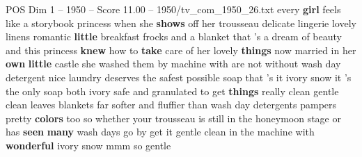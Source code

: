 \begin{textsample}{POS Dim 1 – 1950 – Score 11.00 – 1950/tv\_com\_1950\_26.txt}  \label{ex:f1_pos_003}
every \textbf{girl} feels like a storybook princess when she \textbf{shows} off her trousseau delicate lingerie lovely linens romantic \textbf{little} breakfast frocks and a blanket that 's a dream of beauty and this princess \textbf{knew} how to \textbf{take} care of her lovely \textbf{things} now married in her \textbf{own} \textbf{little} castle she washed them by machine with are not without wash day detergent nice laundry deserves the safest possible soap that 's it ivory snow it 's the only soap both ivory safe and granulated to get \textbf{things} really clean gentle clean leaves blankets far softer and fluffier than wash day detergents pampers pretty \textbf{colors} too so whether your trousseau is still in the honeymoon stage or has \textbf{seen} \textbf{many} wash days go by get it gentle clean in the machine with \textbf{wonderful} ivory snow mmm so gentle

\end{textsample}
